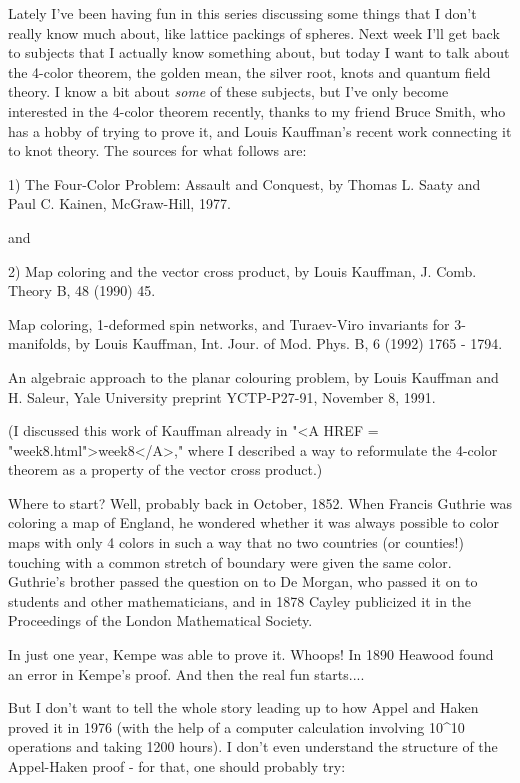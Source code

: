 

Lately I've been having fun in this series discussing some things that I
don't really know much about, like lattice packings of spheres.  Next
week I'll get back to subjects that I actually know something about, but
today I want to talk about the 4-color theorem, the golden mean, the
silver root, knots and quantum field theory.  I know a bit about \emph{some}
of these subjects, but I've only become interested in the 4-color
theorem recently, thanks to my friend Bruce Smith, who has a 
hobby of trying to prove it, and Louis Kauffman's recent work connecting
it to knot theory.  The sources for what follows are:

1)  The Four-Color Problem: Assault and Conquest, by Thomas L. Saaty and
Paul C. Kainen, McGraw-Hill, 1977.

and

2)  Map coloring and the vector cross product, by Louis Kauffman, J. Comb.
Theory B, 48 (1990) 45.

Map coloring, 1-deformed spin networks, and Turaev-Viro
invariants for 3-manifolds, by Louis Kauffman, Int. Jour. of Mod. Phys.
B, 6 (1992) 1765 - 1794. 

An algebraic approach to the planar colouring problem, by Louis Kauffman
and H. Saleur, Yale University preprint YCTP-P27-91, November 8, 1991.

(I discussed this work of Kauffman already in "<A HREF = "week8.html">week8</A>," where I described
a way to reformulate the 4-color theorem as a property of the vector cross
product.)

Where to start?  Well, probably back in October, 1852.  When Francis
Guthrie was coloring a map of England, he wondered whether it was always
possible to color maps with only 4 colors in such a way that no two
countries (or counties!) touching with a common stretch of boundary were
given the same color.  Guthrie's brother passed the question on to De
Morgan, who passed it on to students and other mathematicians, and in
1878 Cayley publicized it in the Proceedings of the London Mathematical
Society.

In just one year, Kempe was able to prove it.  Whoops!  In 1890
Heawood found an error in Kempe's proof.  And then the real fun
starts....

But I don't want to tell the whole story leading up to how Appel and
Haken proved it in 1976 (with the help of a computer calculation
involving 10^10 operations and taking 1200 hours).  I don't even
understand the structure of the Appel-Haken proof - for that, one should
probably try:  

